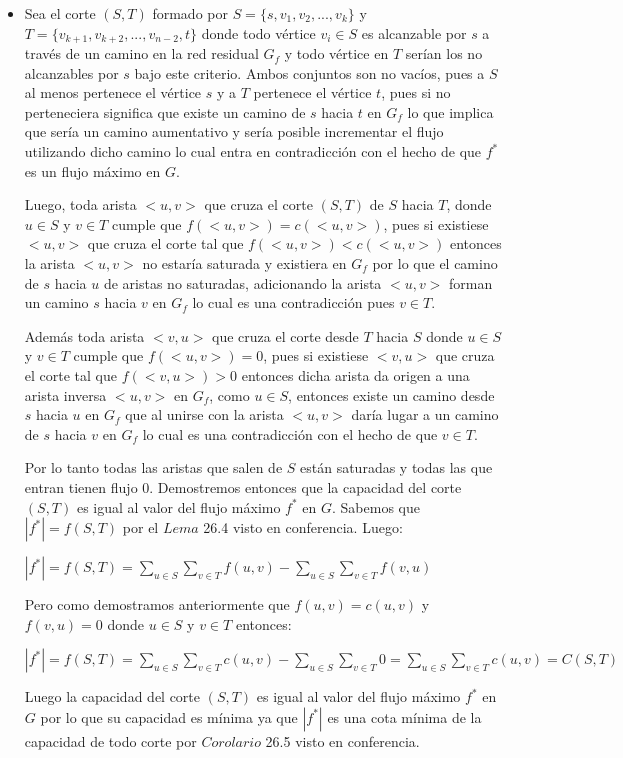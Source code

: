 \documentclass[a4paper,10pt]{article}
\begin{document}
	\begin{itemize} 
		\item[]  Sea el corte $(S,T)$ formado por $S = \{s,v_1,v_2,...,v_k\} $ y $T = \{v_{k+1},v_{k+2},...,v_{n-2},t\} $ donde todo v\'ertice $v_i \in S$ es alcanzable por $s$ a trav\'es de un camino en la red residual $G_f$ y todo v\'ertice en $T$ ser\'ian los no alcanzables por $s$ bajo este criterio. Ambos conjuntos son no vac\'ios, pues a $S$ al menos pertenece el v\'ertice $s$ y a $T$ pertenece el v\'ertice $t$, pues si no perteneciera significa que existe un camino de $s$ hacia $t$ en $G_f$ lo que implica que ser\'ia un camino aumentativo y ser\'ia posible incrementar el flujo utilizando dicho camino lo cual entra en contradicci\'on con el hecho de que $f^*$ es un flujo m\'aximo en $G$.
		
		Luego, toda arista $< u,v >$ que cruza el corte $(S,T)$ de $S$ hacia $T$, donde $u \in S$ y $v \in T$ cumple que $f(< u,v >) = c(< u,v >)$, pues si existiese $< u,v >$ que cruza el corte tal que $f(< u,v >) < c(< u,v >)$ entonces la arista $< u,v >$ no estar\'ia saturada y existiera en $G_f$ por lo que el camino de $s$ hacia $u$ de aristas no saturadas, adicionando la arista $< u,v >$ forman un camino $s$ hacia $v$ en $G_f$ lo cual es una contradicci\'on pues $v \in T$. 
		
		Adem\'as toda arista $< v,u >$ que cruza el corte desde $T$ hacia $S$ donde $u \in S$ y $v \in T$ cumple que $f(< u,v >) = 0$, pues si existiese $< v,u >$ que cruza el corte tal que $f(< v,u >) > 0$ entonces dicha arista da origen a una arista inversa $< u,v >$ en $G_f$, como $u \in S$, entonces existe un camino desde $s$ hacia $u$ en $G_f$ que al unirse con la arista $< u,v >$ dar\'ia lugar a un camino de $s$ hacia $v$ en $G_f$ lo cual es una contradicci\'on con el hecho de que $v \in T$.
		
		Por lo tanto todas las aristas que salen de $S$ est\'an saturadas y todas las que entran tienen flujo 0. Demostremos entonces que la capacidad del corte $(S,T)$ es igual al valor del flujo m\'aximo $f^*$ en $G$. Sabemos que $|f^*| = f(S,T)$ por el $Lema$ 26.4 visto en conferencia. Luego: 
		
		$|f^*| = f(S,T) = \sum\limits_{u\in S}\sum\limits_{v\in T}f(u,v)-\sum\limits_{u\in S}\sum\limits_{v\in T}f(v,u)$ 
		
		Pero como demostramos anteriormente que $f(u,v)=c(u,v)$ y $f(v,u)=0$ donde $u \in S$ y $v \in T$ entonces:
		
		$|f^*| = f(S,T) = \sum\limits_{u\in S}\sum\limits_{v\in T}c(u,v)-\sum\limits_{u\in S}\sum\limits_{v\in T}0 = \sum\limits_{u\in S}\sum\limits_{v\in T}c(u,v) = C(S,T)$
		
		Luego la capacidad del corte $(S,T)$ es igual al valor del flujo m\'aximo $f^*$ en $G$ por lo que su capacidad es m\'inima ya que $|f^*|$ es una cota m\'inima de la capacidad de todo corte por $Corolario$ 26.5 visto en conferencia.  
	\end{itemize}   
	
\end{document}
